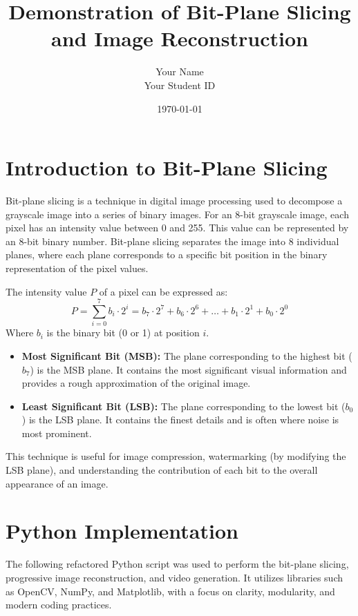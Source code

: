 \documentclass{article}
\title{Demonstration of Bit-Plane Slicing and Image Reconstruction}
\author{Your Name \\ Your Student ID}
\date{\today}
\begin{document}
\maketitle
\thispagestyle{empty}
\newpage

\tableofcontents
\newpage

\section{Introduction to Bit-Plane Slicing}

Bit-plane slicing is a technique in digital image processing used to decompose a grayscale image into a series of binary images. For an 8-bit grayscale image, each pixel has an intensity value between 0 and 255. This value can be represented by an 8-bit binary number. Bit-plane slicing separates the image into 8 individual planes, where each plane corresponds to a specific bit position in the binary representation of the pixel values.

The intensity value $P$ of a pixel can be expressed as:
$$ P = \sum_{i=0}^{7} b_i \cdot 2^i = b_7 \cdot 2^7 + b_6 \cdot 2^6 + \dots + b_1 \cdot 2^1 + b_0 \cdot 2^0 $$
Where $b_i$ is the binary bit (0 or 1) at position $i$.

\begin{itemize}
    \item \textbf{Most Significant Bit (MSB):} The plane corresponding to the highest bit ($b_7$) is the MSB plane. It contains the most significant visual information and provides a rough approximation of the original image.
    \item \textbf{Least Significant Bit (LSB):} The plane corresponding to the lowest bit ($b_0$) is the LSB plane. It contains the finest details and is often where noise is most prominent.
\end{itemize}

This technique is useful for image compression, watermarking (by modifying the LSB plane), and understanding the contribution of each bit to the overall appearance of an image.

\section{Python Implementation}
The following refactored Python script was used to perform the bit-plane slicing, progressive image reconstruction, and video generation. It utilizes libraries such as OpenCV, NumPy, and Matplotlib, with a focus on clarity, modularity, and modern coding practices.
\end{document}
